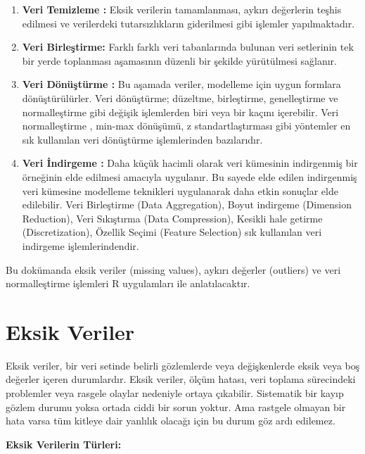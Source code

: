 \documentclass[
  letterpaper,
  DIV=11,
  numbers=noendperiod]{scrreprt}
\begin{document}
\begin{enumerate}
\def\labelenumi{\arabic{enumi}.}
\item
  \textbf{Veri Temizleme :} Eksik verilerin tamamlanması, aykırı
  değerlerin teşhis edilmesi ve verilerdeki tutarsızlıkların giderilmesi
  gibi işlemler yapılmaktadır.
\item
  \textbf{Veri Birleştirme:} Farklı farklı veri tabanlarında bulunan
  veri setlerinin tek bir yerde toplanması aşamasının düzenli bir
  şekilde yürütülmesi sağlanır.
\item
  \textbf{Veri Dönüştürme :} Bu aşamada veriler, modelleme için uygun
  formlara dönüştürülürler. Veri dönüştürme; düzeltme, birleştirme,
  genelleştirme ve normalleştirme gibi değişik işlemlerden biri veya bir
  kaçını içerebilir. Veri normalleştirme , min-max dönüşümü, z
  standartlaştırması gibi yöntemler en sık kullanılan veri dönüştürme
  işlemlerinden bazılarıdır.
\item
  \textbf{Veri İndirgeme :} Daha küçük hacimli olarak veri kümesinin
  indirgenmiş bir örneğinin elde edilmesi amacıyla uygulanır. Bu sayede
  elde edilen indirgenmiş veri kümesine modelleme teknikleri uygulanarak
  daha etkin sonuçlar elde edilebilir. Veri Birleştirme (Data
  Aggregation), Boyut indirgeme (Dimension Reduction), Veri Sıkıştırma
  (Data Compression), Kesikli hale getirme (Discretization), Özellik
  Seçimi (Feature Selection) sık kullanılan veri indirgeme
  işlemlerindendir.
\end{enumerate}

Bu dokümanda eksik veriler (missing values), aykırı değerler (outliers)
ve veri normalleştirme işlemleri R uygulamları ile anlatılacaktır.

\section*{Eksik Veriler}\label{eksik-veriler}


Eksik veriler, bir veri setinde belirli gözlemlerde veya değişkenlerde
eksik veya boş değerler içeren durumlardır. Eksik veriler, ölçüm hatası,
veri toplama sürecindeki problemler veya rasgele olaylar nedeniyle
ortaya çıkabilir. Sistematik bir kayıp gözlem durumu yoksa ortada ciddi
bir sorun yoktur. Ama rastgele olmayan bir hata varsa tüm kitleye dair
yanlılık olacağı için bu durum göz ardı edilemez.

\textbf{Eksik Verilerin Türleri:}
\end{document}
